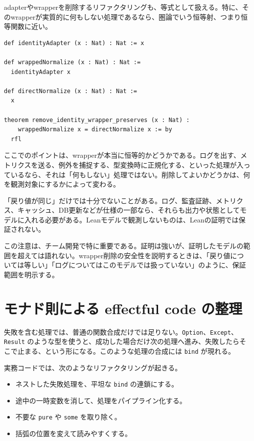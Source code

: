 adapterやwrapperを削除するリファクタリングも、等式として扱える。特に、そのwrapperが実質的に何もしない処理であるなら、圏論でいう恒等射、つまり恒等関数に近い。

\begin{listing}[htbp]
\begin{verbatim}
def identityAdapter (x : Nat) : Nat := x

def wrappedNormalize (x : Nat) : Nat :=
  identityAdapter x

def directNormalize (x : Nat) : Nat :=
  x

theorem remove_identity_wrapper_preserves (x : Nat) :
    wrappedNormalize x = directNormalize x := by
  rfl
\end{verbatim}
\caption{恒等的なwrapperの削除}
\label{lst:ch28-remove-wrapper}
\end{listing}

ここでのポイントは、wrapperが本当に恒等的かどうかである。ログを出す、メトリクスを送る、例外を捕捉する、型変換時に正規化する、といった処理が入っているなら、それは「何もしない」処理ではない。削除してよいかどうかは、何を観測対象にするかによって変わる。

\begin{warningbox}
「戻り値が同じ」だけでは十分でないことがある。ログ、監査証跡、メトリクス、キャッシュ、DB更新などが仕様の一部なら、それらも出力や状態としてモデルに入れる必要がある。Leanモデルで観測しないものは、Leanの証明では保証されない。
\end{warningbox}

この注意は、チーム開発で特に重要である。証明は強いが、証明したモデルの範囲を超えては語れない。wrapper削除の安全性を説明するときは、「戻り値については等しい」「ログについてはこのモデルでは扱っていない」のように、保証範囲を明示する。

\section{モナド則による effectful code の整理}

失敗を含む処理では、普通の関数合成だけでは足りない。\texttt{Option}、\texttt{Except}、\texttt{Result} のような型を使うと、成功した場合だけ次の処理へ進み、失敗したらそこで止まる、という形になる。このような処理の合成には \texttt{bind} が現れる。

実務コードでは、次のようなリファクタリングが起きる。

\begin{itemize}
\item ネストした失敗処理を、平坦な \texttt{bind} の連鎖にする。
\item 途中の一時変数を消して、処理をパイプライン化する。
\item 不要な \texttt{pure} や \texttt{some} を取り除く。
\item 括弧の位置を変えて読みやすくする。
\end{itemize}

